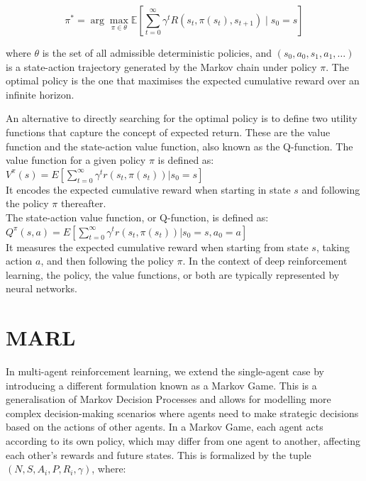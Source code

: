 \documentclass[a4paper,singleside,12pt]{report} %
\begin{document}
\begin{equation}
\pi^* = \arg \max_{\pi \in \theta} \mathbb{E}[\sum_{t=0}^{\infty} \gamma^t R(s_t, \pi(s_t), s_{t+1}) \mid s_0 = s]
\end{equation}

where \(\theta\) is the set of all admissible deterministic policies, and \((s_0, a_0, s_1, a_1, \dots)\) is a state-action trajectory generated by the Markov chain under policy \(\pi\). The optimal policy is the one that maximises the expected cumulative reward over an infinite horizon.

An alternative to directly searching for the optimal policy is to define two utility functions that capture the concept of expected return. These are the value function and the state-action value function, also known as the Q-function. The value function for a given policy \(\pi\) is defined as:\\
${V^{\pi}(s) = E [\sum_{t=0}^{\infty} \gamma^tr(s_t, \pi(s_t))|s_0 = s]}$ \\
It encodes the expected cumulative reward when starting in state \(s\) and following the policy \(\pi\) thereafter.\\
The state-action value function, or Q-function, is defined as: 
${Q^{\pi}(s, a) = E [\sum_{t=0}^{\infty} \gamma^tr(s_t, \pi(s_t))|s_0 = s, a_0 = a]}$ \\
It measures the expected cumulative reward when starting from state \(s\), taking action \(a\), and then following the policy \(\pi\). In the context of deep reinforcement learning, the policy, the value functions, or both are typically represented by neural networks.

\section{MARL}\label{marl}

In multi-agent reinforcement learning, we extend the single-agent case
by introducing a different formulation known as a Markov Game. This is a
generalisation of Markov Decision Processes and allows for modelling
more complex decision-making scenarios where agents need to make
strategic decisions based on the actions of other agents. In a Markov
Game, each agent acts according to its own policy, which may differ from
one agent to another, affecting each other's rewards and future states.
This is formalized by the tuple \((N, S, {A_i}, P, {R_i}, \gamma)\),
where:
\end{document}
